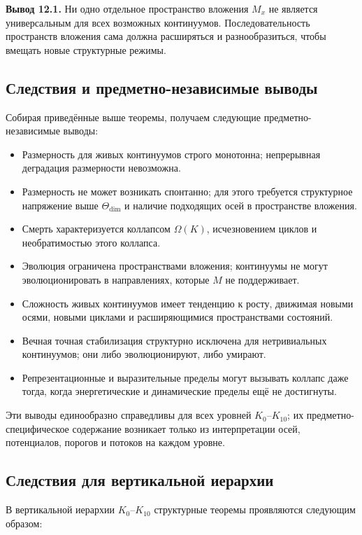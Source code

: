 \textbf{Вывод 12.1.}
Ни одно отдельное пространство вложения \(M_x\) не является универсальным для всех возможных континуумов.
Последовательность пространств вложения сама должна расширяться и разнообразиться, чтобы вмещать новые структурные режимы.

\subsection{Следствия и предметно-независимые выводы}

Собирая приведённые выше теоремы, получаем следующие предметно-независимые выводы:

\begin{itemize}
    \item Размерность для живых континуумов строго монотонна; непрерывная деградация размерности невозможна.
    \item Размерность не может возникать спонтанно; для этого требуется структурное напряжение выше \(\Theta_{\mathrm{dim}}\) и наличие подходящих осей в пространстве вложения.
    \item Смерть характеризуется коллапсом \(\Omega(K)\), исчезновением циклов и необратимостью этого коллапса.
    \item Эволюция ограничена пространствами вложения; континуумы не могут эволюционировать в направлениях, которые \(M\) не поддерживает.
    \item Сложность живых континуумов имеет тенденцию к росту, движимая новыми осями, новыми циклами и расширяющимися пространствами состояний.
    \item Вечная точная стабилизация структурно исключена для нетривиальных континуумов; они либо эволюционируют, либо умирают.
    \item Репрезентационные и выразительные пределы могут вызывать коллапс даже тогда, когда энергетические и динамические пределы ещё не достигнуты.
\end{itemize}

Эти выводы единообразно справедливы для всех уровней \(K_0\)–\(K_{10}\); их предметно-специфическое содержание возникает только из интерпретации осей, потенциалов, порогов и потоков на каждом уровне.

\subsection{Следствия для вертикальной иерархии}

В вертикальной иерархии \(K_0\)–\(K_{10}\) структурные теоремы проявляются следующим образом:

